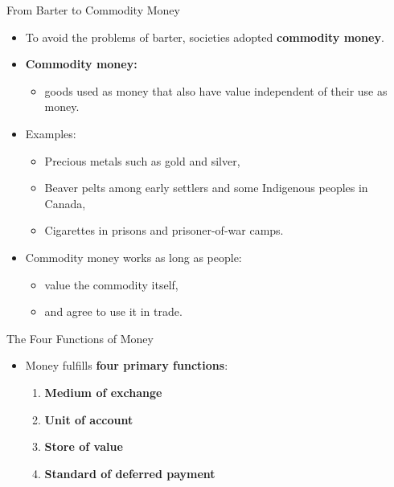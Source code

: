\documentclass[aspectratio=169]{beamer}
\begin{document}
\begin{frame}{From Barter to Commodity Money}
\transfade
\begin{itemize}
  \item To avoid the problems of barter, societies adopted \textbf{commodity money}.
  \item \textbf{Commodity money:}
  \begin{itemize}
    \item goods used as money that also have value independent of their use as money.
  \end{itemize}
  \item Examples:
  \begin{itemize}
    \item Precious metals such as \alert{gold} and \alert{silver},
    \item Beaver pelts among early settlers and some Indigenous peoples in Canada,
    \item Cigarettes in prisons and prisoner-of-war camps.
  \end{itemize}
  \item Commodity money works as long as people:
  \begin{itemize}
    \item value the commodity itself,
    \item and agree to use it in trade.
  \end{itemize}
\end{itemize}
\end{frame}

\begin{frame}{The Four Functions of Money}
\transfade
\begin{itemize}
  \item Money fulfills \textbf{four primary functions}:
  \begin{enumerate}
    \item \textbf{Medium of exchange}
    \item \textbf{Unit of account}
    \item \textbf{Store of value}
    \item \textbf{Standard of deferred payment}
  \end{enumerate}
\end{itemize}
\end{frame}
\end{document}

